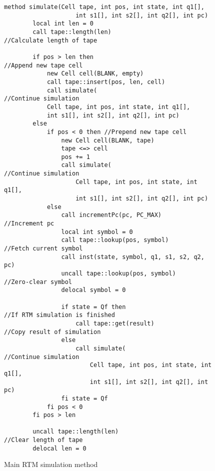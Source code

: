 \begin{figure}[ht]
    \centering
    \begin{lstlisting}[style = basic, language = roopl]
    method simulate(Cell tape, int pos, int state, int q1[], 
                    int s1[], int s2[], int q2[], int pc)
        local int len = 0
        call tape::length(len)                                  //Calculate length of tape

        if pos > len then                                       //Append new tape cell
            new Cell cell(BLANK, empty)
            call tape::insert(pos, len, cell)
            call simulate(                                      //Continue simulation
            Cell tape, int pos, int state, int q1[], 
            int s1[], int s2[], int q2[], int pc) 
        else
            if pos < 0 then //Prepend new tape cell
                new Cell cell(BLANK, tape)
                tape <=> cell
                pos += 1
                call simulate(                                  //Continue simulation
                    Cell tape, int pos, int state, int q1[], 
                    int s1[], int s2[], int q2[], int pc)         
            else
                call incrementPc(pc, PC_MAX)                    //Increment pc
                local int symbol = 0
                call tape::lookup(pos, symbol)                  //Fetch current symbol
                call inst(state, symbol, q1, s1, s2, q2, pc)
                uncall tape::lookup(pos, symbol)                //Zero-clear symbol    
                delocal symbol = 0
                             
                if state = Qf then                              //If RTM simulation is finished
                    call tape::get(result)                      //Copy result of simulation
                else
                    call simulate(                              //Continue simulation
                        Cell tape, int pos, int state, int q1[], 
                        int s1[], int s2[], int q2[], int pc)     
                fi state = Qf
            fi pos < 0
        fi pos > len

        uncall tape::length(len)                                //Clear length of tape
        delocal len = 0
    \end{lstlisting}
    \caption{Main RTM simulation method}
    \label{fig:rtm-simulation-method}
\end{figure}

